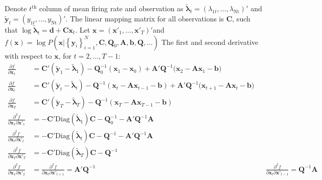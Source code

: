 \documentclass[]{article}
\begin{document}
Denote \(t^{\text{th}}\) column of mean firing rate and observation as \({\widetilde{\bm{\lambda}}}_{t} = \left( \lambda_{1t},\ldots,\lambda_{\text{Nt}} \right)'\)
and \({\widetilde{\mathbf{y}}}_{t} = (y_{1t},\ldots,y_{\text{Nt}})'\).
The linear mapping matrix for all observations is \(\mathbf{C}\), such that
\(\log{\widetilde{\bm{\lambda}}}_{t} = \mathbf{d} + \mathbf{C}\mathbf{x}_{t}\).
Let \(\mathbf{x} = \left( \mathbf{x'}_{1},\ldots,\mathbf{x'}_{T} \right)'\)and
\(f\left( \mathbf{x} \right) = \log{P(\mathbf{x}|\left\{ \mathbf{y}_{i} \right\}_{i = 1}^{N},\mathbf{C},\mathbf{Q}_{0},\mathbf{A},\mathbf{b},\mathbf{Q},\ldots)}\)
The first and second derivative with respect to \(\mathbf{x}\), for \(t=2, \ldots, T-1\):
\begin{align*}
	\frac{\partial f}{\partial\mathbf{x}_{1}} &= \mathbf{C'}\left( {\widetilde{\mathbf{y}}}_{1} - {\widetilde{\bm{\lambda}}}_{1} \right) - \mathbf{Q}_{0}^{- 1}\left( \mathbf{x}_{1} - \mathbf{x}_{0} \right) + \mathbf{A}'\mathbf{Q}^{- 1}\mathbf{(}\mathbf{x}_{2} - \mathbf{A}\mathbf{x}_{1} - \mathbf{b)} \\
	\frac{\partial f}{\partial\mathbf{x}_{t}} &= \mathbf{C'}\left( {\widetilde{\mathbf{y}}}_{t} - {\widetilde{\bm{\lambda}}}_{t} \right) - \mathbf{Q}^{- 1}\left( \mathbf{x}_{t} - \mathbf{A}\mathbf{x}_{t - 1} - \mathbf{b} \right) + \mathbf{A}'\mathbf{Q}^{- 1}(\mathbf{x}_{t + 1} - \mathbf{A}\mathbf{x}_{t} -\mathbf{b)}\\
	\frac{\partial f}{\partial\mathbf{x}_{T}} &= \mathbf{C'}\left( {\widetilde{\mathbf{y}}}_{T} - {\widetilde{\bm{\lambda}}}_{T} \right) - \mathbf{Q}^{- 1}\left( \mathbf{x}_{T} - \mathbf{A}\mathbf{x}_{T - 1} - \mathbf{b} \right)\\
	\frac{\partial^{2}f}{\partial\mathbf{x}_{1}\partial\mathbf{x}'_{1}} &= - \mathbf{C'}\text{Diag}\left( {\widetilde{\bm{\lambda}}}_{1} \right)\mathbf{C} - \mathbf{Q}_{0}^{- 1} - \mathbf{A}'\mathbf{Q}^{- 1}\mathbf{A}\\
	\frac{\partial^{2}f}{\partial\mathbf{x}_{t}\partial\mathbf{x}'_{t}} &= - \mathbf{C'}\text{Diag}\left( {\widetilde{\bm{\lambda}}}_{t} \right)\mathbf{C} - \mathbf{Q}^{- 1} - \mathbf{A}'\mathbf{Q}^{- 1}\mathbf{A}\\
	\frac{\partial^{2}f}{\partial\mathbf{x}_{T}\partial\mathbf{x}'_{T}} &= - \mathbf{C'}\text{Diag}\left( {\widetilde{\bm{\lambda}}}_{T} \right)\mathbf{C} - \mathbf{Q}^{- 1}\\
	\frac{\partial^{2}f}{\partial\mathbf{x}_{1}\partial\mathbf{x}'_{2}} &= \frac{\partial^{2}f}{\partial\mathbf{x}_{t}\partial\mathbf{x}'_{t + 1}} = \mathbf{A}'\mathbf{Q}^{- 1}
	&&\frac{\partial^{2}f}{\partial\mathbf{x}_{t}\partial\mathbf{x}'_{t - 1}} = \mathbf{Q}^{- 1}\mathbf{A}
\end{align*}
\end{document}
